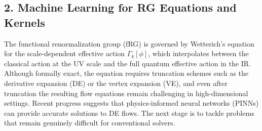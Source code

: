\documentclass[11pt,a4paper]{article}
\begin{document}
\subsection*{2. Machine Learning for RG Equations and Kernels}


The functional renormalization group (fRG) is governed by Wetterich's equation\cite{Wetterich:1992yh} for the scale-dependent effective action $\Gamma_k[\phi]$, which interpolates between the classical action at the UV scale and the full quantum effective action in the IR. Although formally exact, the equation requires truncation schemes such as the derivative expansion (DE) or the vertex expansion (VE), and even after truncation the resulting flow equations remain challenging in high-dimensional settings. Recent progress suggests that physics-informed neural networks (PINNs) can provide accurate solutions to DE flows\cite{Tan:2026bqn}. The next stage is to tackle problems that remain genuinely difficult for conventional solvers.
\end{document}
